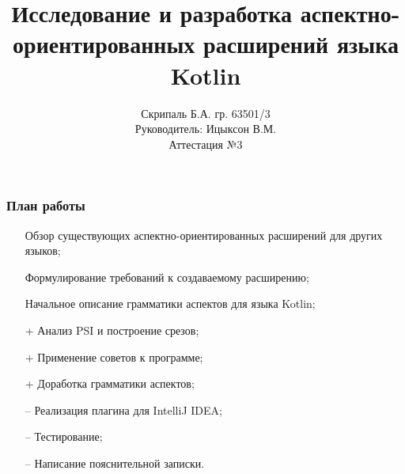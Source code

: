 \documentclass{beamer}
\begin{document}
	
	\title[Разработка АОП для Kotlin]
	{Исследование и разработка аспектно-ориентированных расширений языка 
	Kotlin}
	
	\author[Б.А. Скрипаль]{
		Скрипаль Б.А. гр. 63501/3\\
		Руководитель: Ицыксон В.М.\\
		Аттестация №3
	}
	\date[15.02.2017]{}  
	\frame{\titlepage} 
	
	\begin{frame}
		\frametitle{План работы}
		\begin{itemize}
			\item [\checkmark] Обзор существующих аспектно-ориентированных 
			расширений для других языков;
			\item [\checkmark] Формулирование требований к создаваемому 
			расширению;
			\item [\checkmark] Начальное описание грамматики аспектов для языка 
			Kotlin;
			\item [+] Анализ PSI и построение срезов;
			\item [+] Применение советов к программе;
			\item [+] Доработка грамматики аспектов;
			\item [--] Реализация плагина для IntelliJ IDEA;
			\item [--] Тестирование;
			\item [--] Написание пояснительной записки.
		\end{itemize}
	\end{frame}
	
\end{document}
